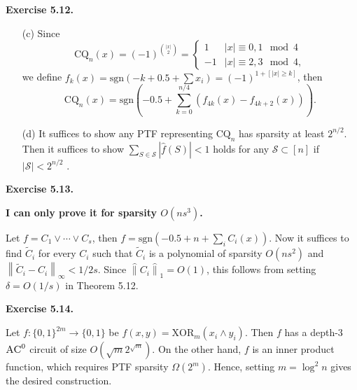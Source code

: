 \documentclass[a4paper]{article}
\newenvironment{exercise}[1]{
	\par
	\noindent\textbf{Exercise #1.}\quad
}{
	\par
	\bigskip
}
\newcommand{\abs}[1]{{\left| #1 \right|}}
\newcommand{\vabs}[1]{{\left\| #1 \right\|}}
\newcommand{\hvabs}[1]{{\hat{\|} #1 \hat{\|}}}
\newcommand{\pbra}[1]{{\left( #1 \right)}}
\newcommand{\bin}{{\{0,1\}}}
\newcommand{\sgn}{\text{sgn}}
\newcommand{\Scal}{\mathcal{S}}
\newcommand{\AC}{\textsc{AC}}
\begin{document}
\begin{exercise}{5.12}
    \begin{itemize}
        \item[(c)] Since
            $$
            \text{CQ}_n(x)=(-1)^{\binom{|x|}2}=\begin{cases}
                1&|x|\equiv 0,1\mod4\\
                -1&|x|\equiv 2,3\mod4,
            \end{cases}
            $$
            we define $f_k(x)=\sgn(-k+0.5+\sum x_i)=(-1)^{1+[|x|\geq k]}$, then
            $$
            \text{CQ}_n(x)=\sgn\pbra{-0.5+\sum_{k=0}^{n/4}\pbra{f_{4k}(x)-f_{4k+2}(x)}}.
            $$
        \item[(d)] It suffices to show any PTF representing $\text{CQ}_n$ has sparsity at least $2^{n/2}$.
            Then it suffices to show $\sum_{S\in\Scal}\abs{\hat f(S)}<1$ holds for any $\Scal\subset[n]$ if $|\Scal|<2^{n/2}$ .
    \end{itemize}
\end{exercise}

\begin{exercise}{5.13}
    \textbf{I can only prove it for sparsity $O(ns^3)$.}

    Let $f=C_1\lor\cdots\lor C_s$, then $f=\sgn(-0.5+n+\sum_iC_i(x))$. Now it suffices to find $\tilde C_i$ for every $C_i$ such 
    that $\tilde C_i$ is a polynomial of sparsity $O(ns^2)$ and $\vabs{\tilde C_i-C_i}_\infty<1/2s$.
    Since $\hvabs{C_i}_1=O(1)$, this follows from setting $\delta=O(1/s)$ in Theorem 5.12.
\end{exercise}

\begin{exercise}{5.14}
    Let $f:\bin^{2m}\to\bin$ be $f(x,y)=\text{XOR}_m(x_i\land y_i)$. Then $f$ has a depth-$3$ $\AC^0$ circuit of size 
    $O(\sqrt m2^{\sqrt m})$. On the other hand, $f$ is an inner product function, which requires PTF sparsity 
    $\Omega(2^m)$. Hence, setting $m=\log^2n$ gives the desired construction.
\end{exercise}
\end{document}
